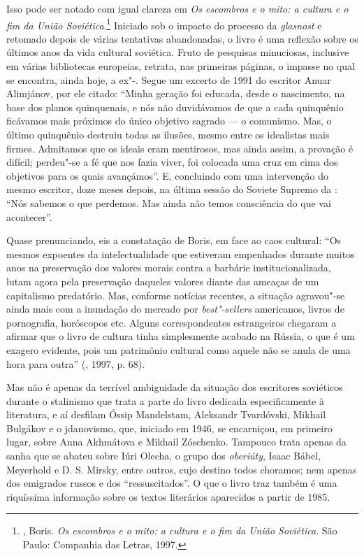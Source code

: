 Isso pode ser notado com igual clareza em \emph{Os escombros e o mito: a
cultura e o fim da União Soviética}.\footnote{, Boris.
  \emph{Os escombros e o mito: a cultura e o fim da União Soviética}.
  São Paulo: Companhia das Letras, 1997.} Iniciado sob o impacto do
processo da \emph{glasnost} e retomado depois de várias tentativas
abandonadas, o livro é uma reflexão sobre os últimos anos da vida
cultural soviética. Fruto de pesquisas minuciosas, inclusive em várias
bibliotecas europeias, retrata, nas primeiras páginas, o impasse no qual
se encontra, ainda hoje, a ex"-. Segue um excerto de 1991 do escritor
Anuar Alimjánov, por ele citado: ``Minha geração foi educada, desde o
nascimento, na base dos planos quinquenais, e nós não duvidávamos de que
a cada quinquênio ficávamos mais próximos do único objetivo sagrado --- o
comunismo. Mas, o último quinquênio destruiu todas as ilusões, mesmo
entre os idealistas mais firmes. Admitamos que os ideais eram
mentirosos, mas ainda assim, a provação é difícil; perdeu"-se a fé que
nos fazia viver, foi colocada uma cruz em cima dos objetivos para os
quais avançámos''. E, concluindo com uma intervenção do mesmo escritor,
doze meses depois, na última sessão do Soviete Supremo da : ``Nós
sabemos o que perdemos. Mas ainda não temos consciência do que vai
acontecer''.

Quase prenunciando, eis a constatação de Boris, em face ao caos cultural:
``Os mesmos expoentes da intelectualidade que estiveram empenhados
durante muitos anos na preservação dos valores morais contra a barbárie
institucionalizada, lutam agora pela preservação daqueles valores diante
das ameaças de um capitalismo predatório. Mas, conforme notícias
recentes, a situação agravou"-se ainda mais com a inundação do mercado
por \emph{best"-sellers} americanos, livros de pornografia, horóscopos
etc. Alguns correspondentes estrangeiros chegaram a afirmar que o livro
de cultura tinha simplesmente acabado na Rússia, o que é um exagero
evidente, pois um patrimônio cultural como aquele não se anula de uma
hora para outra'' (, 1997, p. 68).

Mas não é apenas da terrível ambiguidade da situação dos escritores
soviéticos durante o stalinismo que trata a parte do livro dedicada
especificamente à literatura, e aí desfilam Óssip Mandelstam, Aleksandr
Tvardóvski, Mikhail Bulgákov e o jdanovismo, que, iniciado em 1946, se
encarniçou, em primeiro lugar, sobre Anna Akhmátova e Mikhail Zóschenko.
Tampouco trata apenas da sanha que se abateu sobre Iúri Olecha, o grupo
dos \emph{oberiúty}, Isaac Bábel, Meyerhold e D. S. Mirsky, entre
outros, cujo destino todos choramos; nem apenas dos emigrados russos e
dos ``ressuscitados''. O que o livro traz também é uma riquíssima
informação sobre os textos literários aparecidos a partir de 1985.

